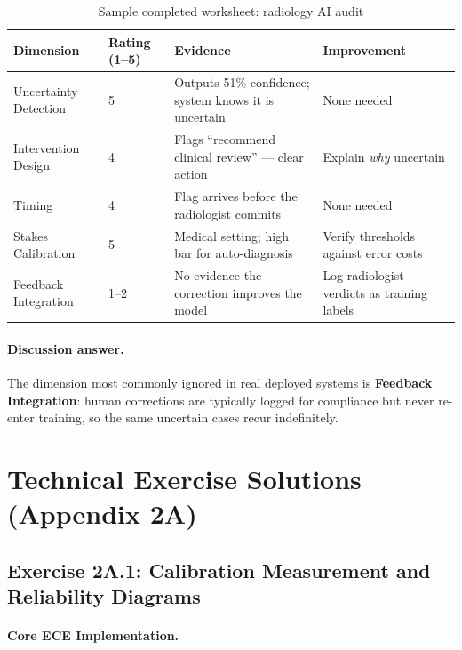 \begin{table}[htbp]
\caption{Sample completed worksheet: radiology AI audit}
\label{tab:radiology-audit-solution}
\centering
\begin{tabular}{@{}p{3.5cm}p{2cm}p{3.5cm}p{3.5cm}@{}}
\toprule
\textbf{Dimension} & \textbf{Rating (1--5)} & \textbf{Evidence} & \textbf{Improvement} \\
\midrule
Uncertainty Detection & 5 & Outputs 51\% confidence; system knows it is uncertain & None needed \\
Intervention Design & 4 & Flags ``recommend clinical review'' --- clear action & Explain \emph{why} uncertain \\
Timing & 4 & Flag arrives before the radiologist commits & None needed \\
Stakes Calibration & 5 & Medical setting; high bar for auto-diagnosis & Verify thresholds against error costs \\
Feedback Integration & 1--2 & No evidence the correction improves the model & Log radiologist verdicts as training labels \\
\bottomrule
\end{tabular}
\end{table}

\paragraph{Discussion answer.} The dimension most commonly ignored in real deployed systems is \textbf{Feedback Integration}: human corrections are typically logged for compliance but never re-enter training, so the same uncertain cases recur indefinitely.

\section{Technical Exercise Solutions (Appendix 2A)}

\subsection{Exercise 2A.1: Calibration Measurement and Reliability Diagrams}

\paragraph{Core ECE Implementation.}

